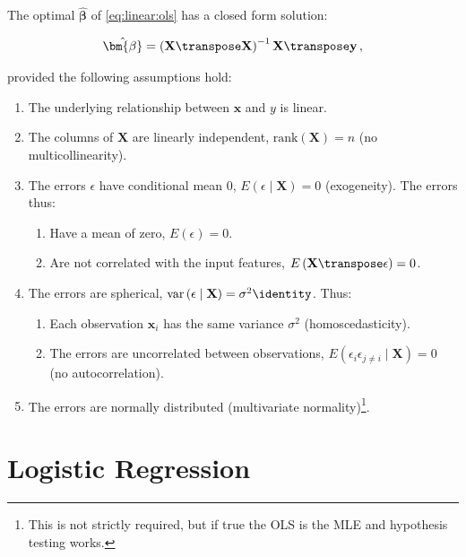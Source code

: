 \noindent The optimal $\hat{\bm{\beta}}$ of \cref{eq:linear:ols} has a closed form solution:

\begin{equation}\label{eq:linear:betahat}
\hat{\bm{\beta}} = \left(\mathbf{X}\transpose\mathbf{X}\right)^{-1}\mathbf{X}\transpose \mathbf{y}\,,
\end{equation}

\noindent provided the following assumptions hold:

\begin{enumerate}[noitemsep]
\item The underlying relationship between $\mathbf{x}$ and $y$ is linear.
\item The columns of $\mathbf{X}$ are linearly independent, \ie $\mathrm{rank}\left(\mathbf{X}\right) = n$ (no multicollinearity).
\item The errors $\epsilon$ have conditional mean 0, $E\left(\epsilon \mid \mathbf{X}\right) = 0$ (exogeneity). The errors thus:
\begin{enumerate}[noitemsep]
\item Have a mean of zero, $E\left(\epsilon\right) = 0$.
\item Are not correlated with the input features, $E\left(\mathbf{X}\transpose\epsilon\right) = 0$.
\end{enumerate}
\item The errors are spherical, $\mathrm{var}\left(\epsilon \mid \mathbf{X}\right) = \sigma^{2} \identity$. Thus:
\begin{enumerate}[noitemsep]
\item Each observation $\mathbf{x}_{i}$ has the same variance $\sigma^{2}$ (homoscedasticity).
\item The errors are uncorrelated between observations, $E\left(\epsilon_{i}\epsilon_{j \neq i} \mid \mathbf{X}\right) = 0$ (no autocorrelation).
\end{enumerate}
\item The errors are normally distributed (multivariate normality)\footnote{This is not strictly required, but if true the OLS is the MLE and hypothesis testing works.}.
\end{enumerate}


\section{Logistic Regression}
\label{regression:logistic}

